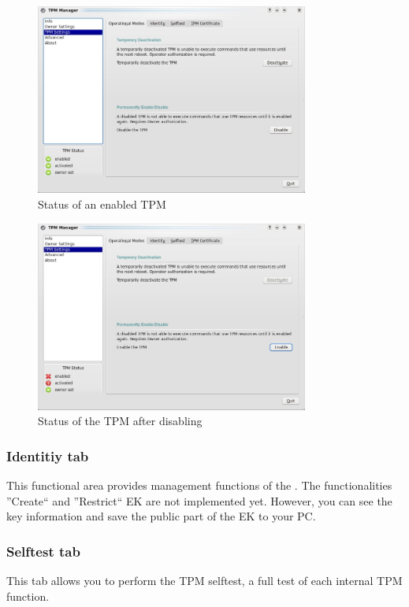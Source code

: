 \documentclass[
  american        %
]{sirrixreport}
\begin{document}
\begin{figure}[h]
 \centering
   \includegraphics[width=0.8\textwidth]{images/tpmmanager_enabled.jpg}
   \caption{Status of an enabled TPM }
\label{fig:disable}
\end{figure}
\begin{figure}[h]
 \centering
   \includegraphics[width=0.8\textwidth]{images/tpmmanager_disabled.jpg}
   \caption{Status of the TPM after disabling}
\label{fig:enable}
\end{figure}
\clearpage

\subsubsection{Identitiy tab} This functional area provides management functions of the \EK. The functionalities ''Create`` and ''Restrict`` EK are not implemented yet. However, you can see the key information and save the public part of the EK to your PC. 
\subsubsection{Selftest tab} This tab allows you to perform the TPM selftest, a full test of each internal TPM function.
\end{document}
